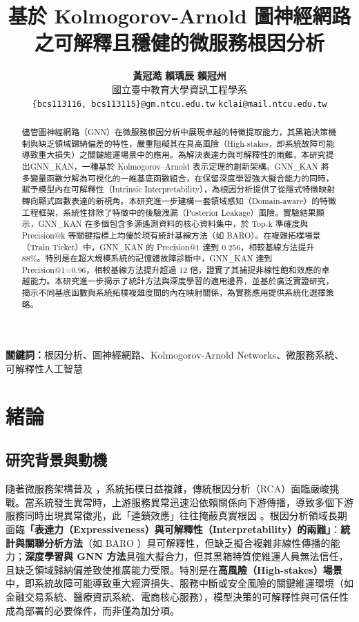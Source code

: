 \documentclass[10pt,a4paper,twocolumn]{article}
\title{基於 Kolmogorov-Arnold 圖神經網路之可解釋且穩健的微服務根因分析}
\author{
    \textbf{黃冠澔} \quad \textbf{賴瑀辰} \quad \textbf{賴冠州} \\[0.5em]
    國立臺中教育大學資訊工程學系 \\[0.3em]
    \texttt{\{bcs113116, bcs113115\}@gm.ntcu.edu.tw} \quad \texttt{kclai@mail.ntcu.edu.tw}
}
\date{}
\begin{document}
\maketitle

\begin{abstract}
\noindent
儘管圖神經網路（GNN）在微服務根因分析中展現卓越的特徵提取能力，其黑箱決策機制與缺乏領域歸納偏差的特性，嚴重阻礙其在具高風險（High-stakes，即系統故障可能導致重大損失）之關鍵維運場景中的應用。為解決表達力與可解釋性的兩難，本研究提出GNN\_KAN，一種基於 Kolmogorov–Arnold 表示定理的創新架構。GNN\_KAN 將多變量函數分解為可視化的一維基底函數組合，在保留深度學習強大擬合能力的同時，賦予模型內在可解釋性（Intrinsic Interpretability），為根因分析提供了從隱式特徵映射轉向顯式函數表達的新視角。本研究進一步建構一套領域感知（Domain-aware）的特徵工程框架，系統性排除了特徵中的後驗洩漏（Posterior Leakage）風險。實驗結果顯示，GNN\_KAN 在多個包含多源遙測資料的核心資料集中，於 Top-k 準確度與 Precision@k 等關鍵指標上均優於現有統計基線方法（如 BARO）。在複雜拓樸場景（Train Ticket）中，GNN\_KAN 的 Precision@1 達到 0.256，相較基線方法提升 88\%。特別是在超大規模系統的記憶體故障診斷中，GNN\_KAN 達到 Precision@1=0.96，相較基線方法提升超過 12 倍，證實了其捕捉非線性飽和效應的卓越能力。本研究進一步揭示了統計方法與深度學習的適用邊界，並基於廣泛實證研究，揭示不同基底函數與系統拓樸複雜度間的內在映射關係，為實務應用提供系統化選擇策略。
\end{abstract}

\noindent\textbf{關鍵詞：}根因分析、圖神經網路、Kolmogorov-Arnold Networks、微服務系統、可解釋性人工智慧

\vspace{0.5em}

\section{緒論}

\subsection{研究背景與動機}

隨著微服務架構普及 \cite{microservices_survey}，系統拓樸日益複雜，傳統根因分析（RCA）面臨嚴峻挑戰。當系統發生異常時，上游服務異常迅速沿依賴關係向下游傳播，導致多個下游服務同時出現異常徵兆，此「連鎖效應」往往掩蔽真實根因 \cite{train_ticket}。根因分析領域長期面臨\textbf{「表達力（Expressiveness）與可解釋性（Interpretability）的兩難」}：\textbf{統計與關聯分析方法}（如 BARO \cite{baro2023}）具可解釋性，但缺乏擬合複雜非線性傳播的能力；\textbf{深度學習與 GNN 方法}具強大擬合力，但其黑箱特質使維運人員無法信任，且缺乏領域歸納偏差致使推廣能力受限。特別是在\textbf{高風險（High-stakes）場景}中，即系統故障可能導致重大經濟損失、服務中斷或安全風險的關鍵維運環境（如金融交易系統、醫療資訊系統、電商核心服務），模型決策的可解釋性與可信任性成為部署的必要條件，而非僅為加分項。
\end{document}
